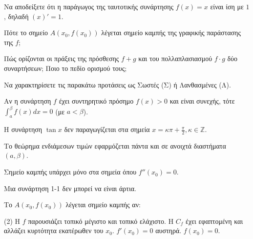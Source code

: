 \documentclass[11pt,a4paper]{article}
\newcommand{\kerkissans}[1]{{\fontfamily{maksf}\selectfont \textbf{#1}}}
\renewcommand{\textdexiakeraia}{}
\newcommand\themanum{A}
\newcounter{thema}[section]
\renewcommand{\thethema}{\arabic{thema}}
\newcommand{\Thema}{\refstepcounter{thema}{\textbf{\textcolor{black}{\faPenSquare\ \  \large \kerkissans{\textbf{\thethemaο\hspace{2mm}Θέμα}}}}}\hspace{0mm}}{}
\newenvironment{thema}[1]
{\begin{tcolorbox}[title=\Thema\kerkissans{\textbf{\large{  #1}}},breakable,
enhanced standard,titlerule=0pt,toprule=0pt, rightrule=0pt, bottomrule=0pt,
colback=white,left=0mm,top=1mm,bottom=0mm,
boxrule=0pt,
colframe=white,leftrule=0mm,sharp corners,coltitle=black]
\renewcommand{\themanum}{#1}}
{\end{tcolorbox}}
\begin{document}
\begin{thema}{A}
\begin{erwthma}
    \item Να αποδείξετε ότι η παράγωγος της ταυτοτικής συνάρτησης $f(x) = x$ είναι ίση με $1$, δηλαδή $(x)' = 1$.
    \item Πότε το σημείο $A(x_0, f(x_0))$ λέγεται σημείο καμπής της γραφικής παράστασης της $f$;
    \item Πώς ορίζονται οι πράξεις της πρόσθεσης $f+g$ και του πολλαπλασιασμού $f \cdot g$ δύο συναρτήσεων; Ποιο το πεδίο ορισμού τους;
    \item Να χαρακτηρίσετε τις παρακάτω προτάσεις ως Σωστές (Σ) ή Λανθασμένες (Λ).
    \begin{alist}
        \item Αν η συνάρτηση $f$ έχει συντηρητικό πρόσημο $f(x)>0$ και είναι συνεχής, τότε $\int_a^\beta f(x)dx=0$ (με $a<\beta$).
        \item Η συνάρτηση $\tan x$ δεν παραγωγίζεται στα σημεία $x = \kappa \pi + \frac{\pi}{2}, \kappa \in \mathbb{Z}$.
        \item Το θεώρημα ενδιάμεσων τιμών εφαρμόζεται πάντα και σε ανοιχτά διαστήματα $(a,\beta)$.
        \item Σημείο καμπής υπάρχει μόνο στα σημεία όπου $f''(x_0)=0$.
        \item Μια συνάρτηση 1-1 δεν μπορεί να είναι άρτια.
    \end{alist}
    \item Το $A(x_0, f(x_0))$ λέγεται σημείο καμπής αν:
    \begin{tasks}[label=\let\textdexiakeraia\relax\alph*.](2)
        \task H $f$ παρουσιάζει τοπικό μέγιστο και τοπικό ελάχιστο.
        \task H $C_f$ έχει εφαπτομένη και αλλάζει κυρτότητα εκατέρωθεν του $x_0$.
        \task $f'(x_0) = 0$ αυστηρά.
        \task $f(x_0) = 0$.
    \end{tasks}
\end{erwthma}
\end{thema}
\vspace{1cm}
\end{document}
